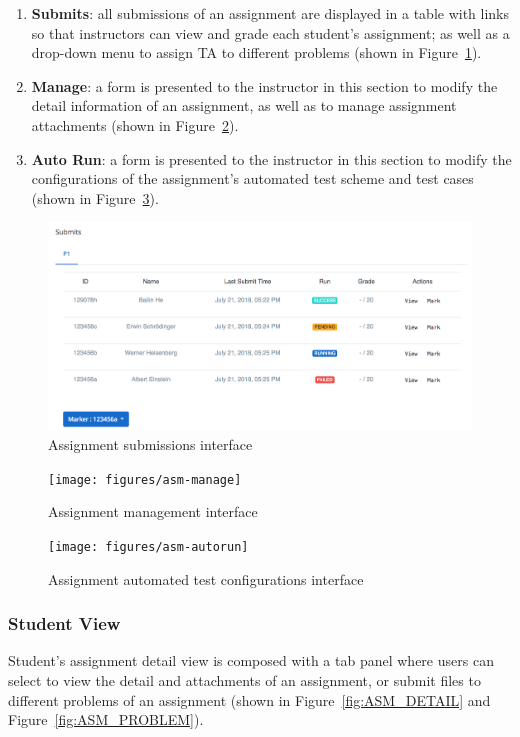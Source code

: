 \begin{enumerate}
    \item \textbf{Submits}: all submissions of an assignment are displayed
        in a table with links so that instructors can view and grade each
        student's assignment; as well as a drop-down menu to assign TA to
        different problems (shown in Figure~\ref{fig:ASM_SUBMITS}).
    \item \textbf{Manage}: a form is presented to the instructor in this section
        to modify the detail information of an assignment, as well as to
        manage assignment attachments (shown in Figure~\ref{fig:ASM_MANAGE}).
    \item \textbf{Auto Run}: a form is presented to the instructor in this
        section to modify the configurations of the assignment's automated
        test scheme and test cases (shown in Figure~\ref{fig:ASM_AUTORUN}).
\end{enumerate}

\begin{figure}[H]
    \centering
        \includegraphics[width=1.0\textwidth]{figures/asm-submits}
    \caption{Assignment submissions interface}
    \label{fig:ASM_SUBMITS}
\end{figure}

\begin{figure}[H]
    \centering
        \texttt{[image: figures/asm-manage]}
    \caption{Assignment management interface}
    \label{fig:ASM_MANAGE}
\end{figure}

\begin{figure}[H]
    \centering
        \texttt{[image: figures/asm-autorun]}
    \caption{Assignment automated test configurations interface}
    \label{fig:ASM_AUTORUN}
\end{figure}

\subsubsection{Student View}
Student's assignment detail view is composed with a tab panel where users can
select to view the detail and attachments of an assignment, or submit files
to different problems of an assignment (shown in Figure~\ref{fig:ASM_DETAIL}
and Figure~\ref{fig:ASM_PROBLEM}).

